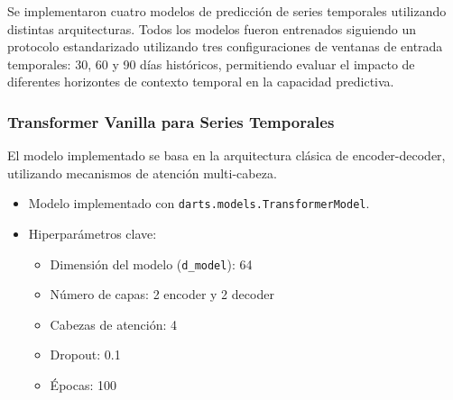 \documentclass[12pt]{article}
\begin{document}
Se implementaron cuatro modelos de predicción de series temporales utilizando distintas arquitecturas.
Todos los modelos fueron entrenados siguiendo un protocolo estandarizado utilizando tres configuraciones de ventanas de entrada temporales: 30, 60 y 90 días históricos, permitiendo evaluar el impacto de diferentes horizontes de contexto temporal en la capacidad predictiva.



\subsubsection{Transformer Vanilla para Series Temporales}

El modelo implementado se basa en la arquitectura clásica de encoder-decoder, utilizando mecanismos de atención multi-cabeza.

\begin{itemize}
\item Modelo implementado con \texttt{darts.models.TransformerModel}.
\item Hiperparámetros clave:
\begin{itemize}
\item Dimensión del modelo (\texttt{d\_model}): 64
\item Número de capas: 2 encoder y 2 decoder
\item Cabezas de atención: 4
\item Dropout: 0.1
\item Épocas: 100
\end{itemize}
\end{itemize}
\end{document}
